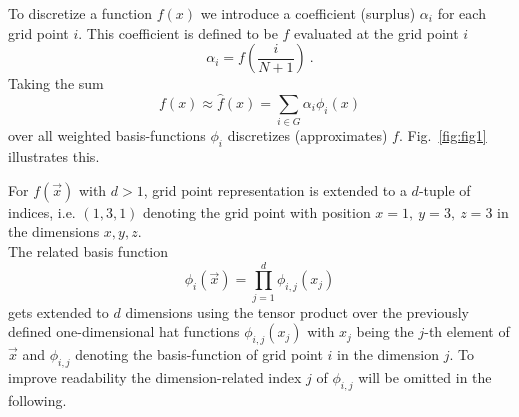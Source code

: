 \par

To discretize a function $f(x)$ we introduce a coefficient (surplus)
$\alpha_i$ for each grid point $i$. This coefficient is defined to be
$f$ evaluated at the grid point $i$
$$\alpha_i = f(\frac{i}{N+1}) \ .$$
Taking the sum
$$ f(x) \approx  \hat{f}(x) = \sum_{i \in G}{\alpha_i \phi_i(x)} $$
over all weighted basis-functions $\phi_i$ discretizes (approximates) $f$.
Fig.~\ref{fig:fig1} illustrates this.

\par

For $f(\vec{x})$ with $d > 1$, grid point representation is extended to
a $d$-tuple of indices, i.e. $(1,3,1)$ denoting the grid point with position
$x = 1, \ y = 3, \ z = 3$ in the dimensions $x,y,z$. \\
The related basis function
$$\phi_i(\vec{x}) = \prod_{j=1}^d{\phi_{i,j}(x_j)}$$
gets extended to $d$ dimensions using the tensor
product over the previously defined one-dimensional hat functions
$\phi_{i,j}(x_j)$ with $x_j$ being the $j$-th element of $\vec{x}$ and
$\phi_{i,j}$ denoting the basis-function of grid point $i$ in the dimension
$j$. To improve readability the dimension-related index $j$ of $\phi_{i,j}$
will be omitted in the following.

